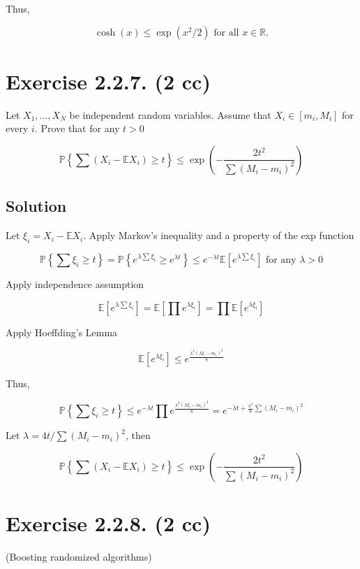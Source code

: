 \documentclass{article}
\begin{document}
Thus,

$$\cosh(x) \leq \exp(x^2/2) \text{ for all } x \in \mathbb R.$$

\section{Exercise 2.2.7. (2 cc)}

Let $X_1 , . . . , X_N$ be independent random variables. Assume that $X_i \in [m_i , M_i ]$ for every $i$. Prove that for any $t > 0$

$$\mathbb P \left\{ \sum (X_i - \mathbb E X_i) \geq t \right\} \leq \exp\left( -\frac{2t^2}{\sum(M_i - m_i)^2}\right)$$

\subsection{Solution}

Let $\xi_i = X_i - \mathbb E X_i$. Apply Markov's inequality and a property of the exp function

$$\mathbb P \left\{ \sum \xi_i \geq t \right\} = \mathbb P \left\{ e^{\lambda \sum \xi_i} \geq e^{\lambda t} \right\} \leq e^{-\lambda t} \mathbb E \left[ e^{\lambda \sum \xi_i}\right]  \text{ for any } \lambda > 0 $$

Apply independence assumption

$$\mathbb E \left[ e^{\lambda \sum \xi_i}\right] = \mathbb E \left[ \prod e^{\lambda \xi_i}\right] = \prod \mathbb E \left[ e^{\lambda \xi_i}\right]$$

Apply Hoeffding's Lemma

$$\mathbb E \left[ e^{\lambda \xi_i}\right] \leq e^{\frac{\lambda^2(M_i - m_i)^2}{8}}$$

Thus,

$$\mathbb P \left\{ \sum \xi_i \geq t \right\} \leq e^{-\lambda t} \prod e^{\frac{\lambda^2(M_i - m_i)^2}{8}} = e^{-\lambda t + \frac{\lambda^2}{8}\sum (M_i - m_i)^2}$$

Let $\lambda = 4t/\sum(M_i - m_i)^2$, then

$$\mathbb P \left\{ \sum (X_i - \mathbb E X_i) \geq t \right\} \leq \exp\left( -\frac{2t^2}{\sum(M_i - m_i)^2}\right)$$

\section{Exercise 2.2.8. (2 cc)}

(Boosting randomized algorithms)
\end{document}
